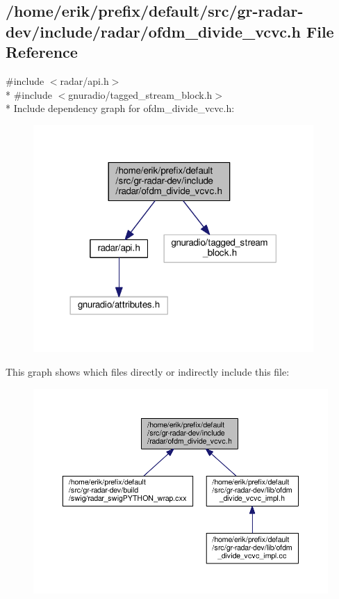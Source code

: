 \subsection{/home/erik/prefix/default/src/gr-\/radar-\/dev/include/radar/ofdm\+\_\+divide\+\_\+vcvc.h File Reference}
\label{ofdm__divide__vcvc_8h}
{\ttfamily \#include $<$radar/api.\+h$>$}\\*
{\ttfamily \#include $<$gnuradio/tagged\+\_\+stream\+\_\+block.\+h$>$}\\*
Include dependency graph for ofdm\+\_\+divide\+\_\+vcvc.\+h\+:
\nopagebreak
\begin{figure}[H]
\begin{center}
\leavevmode
\includegraphics[width=302pt]{df/d88/ofdm__divide__vcvc_8h__incl}
\end{center}
\end{figure}
This graph shows which files directly or indirectly include this file\+:
\nopagebreak
\begin{figure}[H]
\begin{center}
\leavevmode
\includegraphics[width=350pt]{dc/d93/ofdm__divide__vcvc_8h__dep__incl}
\end{center}
\end{figure}
